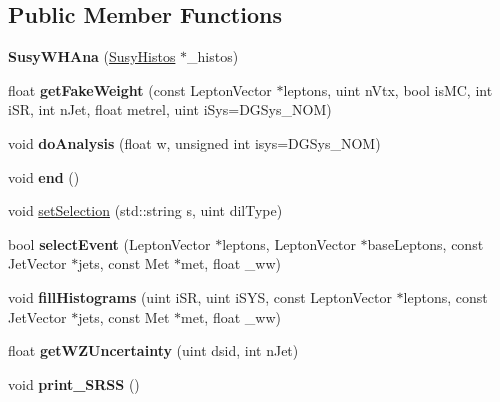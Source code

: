\subsection*{Public Member Functions}
\begin{DoxyCompactItemize}
\item 
\hypertarget{classSusyWHAna_af63bb9a2a7f0229cf0051cd6b37727b8}{
{\bfseries SusyWHAna} (\hyperlink{classSusyHistos}{SusyHistos} $\ast$\_\-histos)}
\label{classSusyWHAna_af63bb9a2a7f0229cf0051cd6b37727b8}

\item 
\hypertarget{classSusyWHAna_abc1802b72a674ca1958fa2773cdf5efe}{
float {\bfseries getFakeWeight} (const LeptonVector $\ast$leptons, uint nVtx, bool isMC, int iSR, int nJet, float metrel, uint iSys=DGSys\_\-NOM)}
\label{classSusyWHAna_abc1802b72a674ca1958fa2773cdf5efe}

\item 
\hypertarget{classSusyWHAna_a1bd7988df31894a720729a2208e036e4}{
void {\bfseries doAnalysis} (float w, unsigned int isys=DGSys\_\-NOM)}
\label{classSusyWHAna_a1bd7988df31894a720729a2208e036e4}

\item 
\hypertarget{classSusyWHAna_ad93312cf338d21a33d2e72077b2a5757}{
void {\bfseries end} ()}
\label{classSusyWHAna_ad93312cf338d21a33d2e72077b2a5757}

\item 
void \hyperlink{classSusyWHAna_a1926975fddfbbe119c0a6915f303d2db}{setSelection} (std::string s, uint dilType)
\item 
\hypertarget{classSusyWHAna_a370b43f741c46ce2ef2dbb637db837fb}{
bool {\bfseries selectEvent} (LeptonVector $\ast$leptons, LeptonVector $\ast$baseLeptons, const JetVector $\ast$jets, const Met $\ast$met, float \_\-ww)}
\label{classSusyWHAna_a370b43f741c46ce2ef2dbb637db837fb}

\item 
\hypertarget{classSusyWHAna_a2d484e90dc35907e883fc54247b4df7b}{
void {\bfseries fillHistograms} (uint iSR, uint iSYS, const LeptonVector $\ast$leptons, const JetVector $\ast$jets, const Met $\ast$met, float \_\-ww)}
\label{classSusyWHAna_a2d484e90dc35907e883fc54247b4df7b}

\item 
\hypertarget{classSusyWHAna_a8508532b9fc8c2a84dd83bfd6657e683}{
float {\bfseries getWZUncertainty} (uint dsid, int nJet)}
\label{classSusyWHAna_a8508532b9fc8c2a84dd83bfd6657e683}

\item 
\hypertarget{classSusyWHAna_a6d9f2cc6ae4edb2c8290ab3112b10540}{
void {\bfseries print\_\-SRSS} ()}
\label{classSusyWHAna_a6d9f2cc6ae4edb2c8290ab3112b10540}


\end{DoxyCompactItemize}
